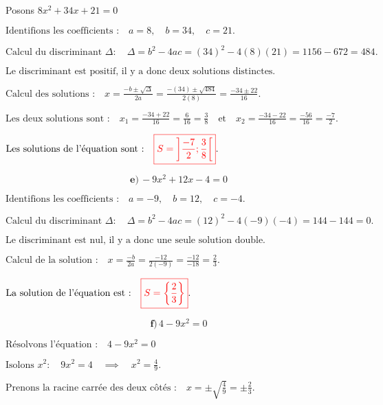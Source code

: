 \documentclass[12pt,a4paper]{article}
\begin{document}
Posons \( 8x^2 + 34x + 21 = 0 \)

\(
\text{Identifions les coefficients :} \quad a = 8, \quad b = 34, \quad c = 21.
\)

\(
\text{Calcul du discriminant } \Delta : \quad
\Delta = b^2 - 4ac = (34)^2 - 4(8)(21) = 1156 - 672  = 484.
\)

\(
\text{Le discriminant est positif, il y a donc deux solutions distinctes.}
\)

\(
\text{Calcul des solutions :} \quad
x = \frac{-b \pm \sqrt{\Delta}}{2a} = \frac{-(34) \pm \sqrt{484}}{2(8)} = \frac{-34 \pm 22}{16}.
\)

\(
\text{Les deux solutions sont :} \quad
x_1 = \frac{-34 + 22}{16} = \frac{6}{16} = \frac{3}{8} \quad \text{et} \quad x_2 = \frac{-34 - 22}{16} = \frac{-56}{16} = \frac{-7}{2}.
\)


\(
\text{Les solutions de l'équation sont :} \quad
\textcolor{red}{\boxed{S=\left]\frac{-7}{2};\frac{3}{8} \right[ }}.
\)


\[ \textbf{e)} \, -9x^2 + 12x - 4 = 0 \]

\(
\text{Identifions les coefficients :} \quad a = -9, \quad b = 12, \quad c = -4.
\)

\(
\text{Calcul du discriminant } \Delta : \quad
\Delta = b^2 - 4ac = (12)^2 - 4(-9)(-4) = 144 - 144 = 0.
\)

\(
\text{Le discriminant est nul, il y a donc une seule solution double.}
\)

\(
\text{Calcul de la solution :} \quad
x = \frac{-b}{2a} = \frac{-12}{2(-9)} = \frac{-12}{-18} = \frac{2}{3}.
\)

\(
\text{La solution de l'équation est :} \quad
\textcolor{red}{\boxed{S=\left\lbrace  \frac{2}{3} \right\rbrace }}.
\)

\[ \textbf{f)} \, 4 - 9x^2 = 0 \]

\( \text{Résolvons l'équation :} \quad 4 - 9x^2 = 0 \)

\(
\text{Isolons } x^2 : \quad 9x^2 = 4 \quad \implies \quad x^2 = \frac{4}{9}.
\)

\(
\text{Prenons la racine carrée des deux côtés :} \quad x = \pm \sqrt{\frac{4}{9}} = \pm \frac{2}{3}.
\)
\end{document}
